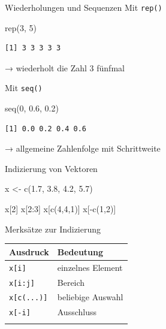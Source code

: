\documentclass[
  10pt,
  ignorenonframetext,
  aspectratio=169,
]{beamer}
\newenvironment{Shaded}{}{}
\newcommand{\DecValTok}[1]{\textcolor[rgb]{0.25,0.63,0.44}{#1}}
\newcommand{\FloatTok}[1]{\textcolor[rgb]{0.25,0.63,0.44}{#1}}
\newcommand{\FunctionTok}[1]{\textcolor[rgb]{0.02,0.16,0.49}{#1}}
\newcommand{\NormalTok}[1]{#1}
\newcommand{\OtherTok}[1]{\textcolor[rgb]{0.00,0.44,0.13}{#1}}
\newcommand{\SpecialCharTok}[1]{\textcolor[rgb]{0.25,0.44,0.63}{#1}}
\begin{document}
\begin{frame}[fragile]{Wiederholungen und Sequenzen}
\label{wiederholungen-und-sequenzen}
Mit \texttt{rep()}

\begin{Shaded}
\begin{Highlighting}[]
\FunctionTok{rep}\NormalTok{(}\DecValTok{3}\NormalTok{, }\DecValTok{5}\NormalTok{)}
\end{Highlighting}
\end{Shaded}

\begin{verbatim}
[1] 3 3 3 3 3
\end{verbatim}

→ wiederholt die Zahl 3 fünfmal

Mit \texttt{seq()}

\begin{Shaded}
\begin{Highlighting}[]
\FunctionTok{seq}\NormalTok{(}\DecValTok{0}\NormalTok{, }\FloatTok{0.6}\NormalTok{, }\FloatTok{0.2}\NormalTok{)}
\end{Highlighting}
\end{Shaded}

\begin{verbatim}
[1] 0.0 0.2 0.4 0.6
\end{verbatim}

→ allgemeine Zahlenfolge mit Schrittweite
\end{frame}

\begin{frame}[fragile]{Indizierung von Vektoren}
\label{indizierung-von-vektoren}
\begin{Shaded}
\begin{Highlighting}[]
\NormalTok{x }\OtherTok{\textless{}{-}} \FunctionTok{c}\NormalTok{(}\FloatTok{1.7}\NormalTok{, }\FloatTok{3.8}\NormalTok{, }\FloatTok{4.2}\NormalTok{, }\FloatTok{5.7}\NormalTok{)}

\NormalTok{x[}\DecValTok{2}\NormalTok{]}
\NormalTok{x[}\DecValTok{2}\SpecialCharTok{:}\DecValTok{3}\NormalTok{]}
\NormalTok{x[}\FunctionTok{c}\NormalTok{(}\DecValTok{4}\NormalTok{,}\DecValTok{4}\NormalTok{,}\DecValTok{1}\NormalTok{)]}
\NormalTok{x[}\SpecialCharTok{{-}}\FunctionTok{c}\NormalTok{(}\DecValTok{1}\NormalTok{,}\DecValTok{2}\NormalTok{)]}
\end{Highlighting}
\end{Shaded}
\end{frame}

\begin{frame}[fragile]{Merksätze zur Indizierung}
\label{merksuxe4tze-zur-indizierung}
\begin{longtable}[]{@{}ll@{}}
\toprule\noalign{}
Ausdruck & Bedeutung \\
\midrule\noalign{}
\endhead
\texttt{x{[}i{]}} & einzelnes Element \\
\texttt{x{[}i:j{]}} & Bereich \\
\texttt{x{[}c(...){]}} & beliebige Auswahl \\
\texttt{x{[}-i{]}} & Ausschluss \\
\bottomrule\noalign{}
\end{longtable}
\end{frame}
\end{document}
